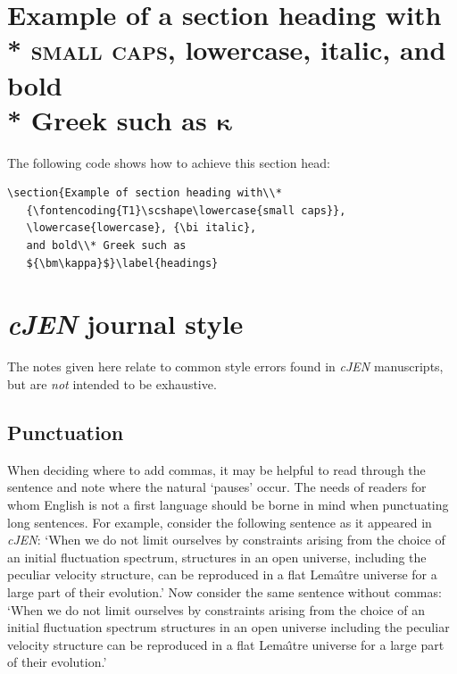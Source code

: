 \documentclass[]{cJEN2e}
\begin{document}
\section{Example of a section heading with\\*
   {\scshape\lowercase{small caps}},
   \lowercase{lowercase}, {\bi italic},
   and bold\\* Greek such as
   ${\bm\kappa}$}\label{headings}

%
The following code shows how to achieve this section head:
%
\begin{verbatim}
\section{Example of section heading with\\*
   {\fontencoding{T1}\scshape\lowercase{small caps}},
   \lowercase{lowercase}, {\bi italic},
   and bold\\* Greek such as
   ${\bm\kappa}$}\label{headings}
\end{verbatim}
%
%

\section{{\textit{cJEN}} journal style}

The notes given here relate to common style errors found in  {{\it cJEN}} manuscripts, but are {\itshape not\/}
intended to be exhaustive.

\subsection{Punctuation}

When  deciding  where to add commas, it may be  helpful  to  read through  the sentence and note where the
natural `pauses'  occur. The  needs  of readers for whom English is not a  first  language should  be  borne in
mind when punctuating  long  sentences.  For example, consider the following sentence as it appeared in {\it
cJEN}: `When we do not limit ourselves by constraints arising from the choice of an initial fluctuation spectrum,
structures in an open universe, including the peculiar velocity structure,  can be reproduced  in a flat
Lema\^{\i}tre universe for a large  part of their evolution.' Now consider the same sentence without commas:
`When  we do not limit ourselves by constraints arising from  the choice  of an initial fluctuation spectrum
structures in an  open universe including the peculiar velocity structure can be reproduced in  a  flat
Lema\^{\i}tre universe for a large  part of  their evolution.'
\end{document}
